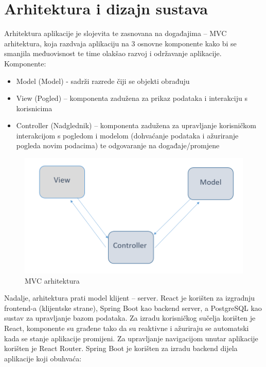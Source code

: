 \chapter{Arhitektura i dizajn sustava}
		
	
	\noindent Arhitektura aplikacije je slojevita te zasnovana na događajima – MVC arhitektura, koja razdvaja aplikaciju na 3 osnovne komponente kako bi se smanjila međuovisnost te time olakšao razvoj i održavanje aplikacije. Komponente:
	
		\begin{itemize}
		\item Model (Model) - sadrži razrede čiji se objekti obrađuju
		\item View (Pogled) – komponenta zadužena za prikaz podataka i interakciju s korisnicima
		\item Controller (Nadglednik) – komponenta zadužena za upravljanje korisničkom interakcijom s pogledom i modelom (dohvaćanje podataka i ažuriranje pogleda novim podacima) te odgovaranje na događaje/promjene
		\end{itemize}
		
			\begin{figure}[H]
			\includegraphics[scale=0.45]{slike/MVC.PNG} %
			\centering
			\caption{MVC arhitektura}
			\label{fig:mvc} %
		\end{figure}

	\noindent Nadalje, arhitektura prati model klijent – server. 
	React je korišten za izgradnju frontend-a (klijentske strane), Spring Boot kao backend server, a PostgreSQL kao sustav za upravljanje bazom podataka. Za izradu korisničkog sučelja korišten je React, komponente su građene tako da su reaktivne i ažuriraju se automatski kada se stanje aplikacije promijeni. Za upravljanje navigacijom unutar aplikacije korišten je React Router.
	Spring Boot je korišten za izradu backend dijela aplikacije koji obuhvaća:
	
